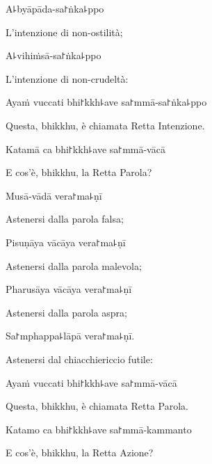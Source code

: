 A꜕byāpāda-sa꜓ṅka꜕ppo

\begin{english}
  L'intenzione di non-ostilità;
\end{english}

A꜕vihiṁsā-sa꜓ṅka꜕ppo

\begin{english}
  L'intenzione di non-crudeltà:
\end{english}

Ayaṁ vuccati bhi꜓kkh꜕ave sa꜓mmā-sa꜓ṅka꜕ppo

\begin{english}
  Questa, bhikkhu, è chiamata Retta Intenzione.
\end{english}

Katamā ca bhi꜓kkh꜕ave sa꜓mmā-vācā

\begin{english}
  E cos'è, bhikkhu, la Retta Parola?
\end{english}

Musā-vādā vera꜓ma꜕ṇī

\begin{english}
  Astenersi dalla parola falsa;
\end{english}

Pisuṇāya vācāya vera꜓ma꜕ṇī

\begin{english}
  Astenersi dalla parola malevola;
\end{english}

Pharusāya vācāya vera꜓ma꜕ṇī

\begin{english}
  Astenersi dalla parola aspra;
\end{english}

Sa꜓mphappa꜕lāpā vera꜓ma꜕ṇī.

\begin{english}
  Astenersi dal chiacchiericcio futile:
\end{english}

\ifaivedition
\clearpage
\fi

Ayaṁ vuccati bhi꜓kkh꜕ave sa꜓mmā-vācā

\begin{english}
  Questa, bhikkhu, è chiamata Retta Parola.
\end{english}

Katamo ca bhi꜓kkh꜕ave sa꜓mmā-kammanto

\begin{english}
  E cos'è, bhikkhu, la Retta Azione?
\end{english}


